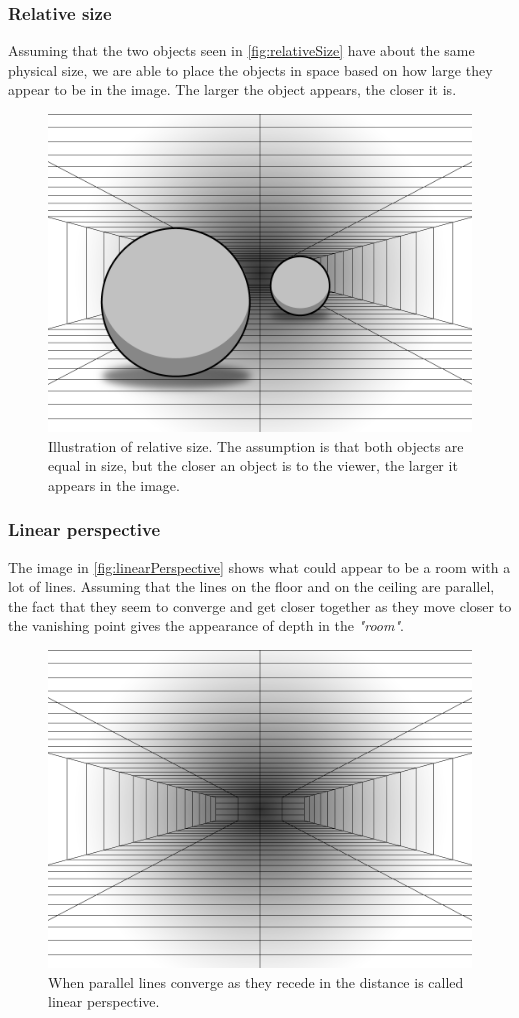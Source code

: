 \subsubsection{Relative size}
Assuming that the two objects seen in \autoref{fig:relativeSize} have about the same physical size, we are able to place the objects in space based on how large they appear to be in the image. The larger the object appears, the closer it is\citep[p.~200]{sensationPerception}.
\begin{figure}[H]
	\centering
	\includegraphics[width=0.8\linewidth]{figure/Analysis/relativeSize.png}
	\caption{Illustration of relative size. The assumption is that both objects are equal in size, but the closer an object is to the viewer, the larger it appears in the image.}
	\label{fig:relativeSize}
\end{figure}

\subsubsection{Linear perspective}
The image in \autoref{fig:linearPerspective} shows what could appear to be a room with a lot of lines. Assuming that the lines on the floor and on the ceiling are parallel, the fact that they seem to converge and get closer together as they move closer to the vanishing point gives the appearance of depth in the \textit{"room"}\citep[p.~201]{sensationPerception}.
\begin{figure}[H]
	\centering
	\includegraphics[width=0.8\linewidth]{figure/Analysis/linearPerspective.png}
	\caption{When parallel lines converge as they recede in the distance is called linear perspective.}
	\label{fig:linearPerspective}
\end{figure}


